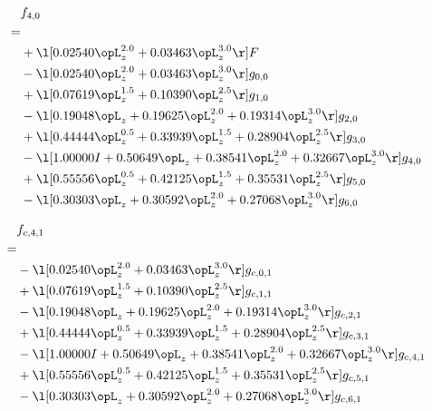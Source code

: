 \begin{alignat}{2} 
\label{eq:f_40_0} 
& f_{4,0} \nonumber \\ 
 = \\ 
& + \l[  0.02540 \opL_z^{2.0} +  0.03463 \opL_z^{3.0}  \r] F \nonumber \\ 
& - \l[  0.02540 \opL_z^{2.0} +  0.03463 \opL_z^{3.0}  \r] g_{0,0} \nonumber \\ 
& + \l[  0.07619 \opL_z^{1.5} +  0.10390 \opL_z^{2.5}  \r] g_{1,0} \nonumber \\ 
& - \l[  0.19048 \opL_z +  0.19625 \opL_z^{2.0} +  0.19314 \opL_z^{3.0}  \r] g_{2,0} \nonumber \\ 
& + \l[  0.44444 \opL_z^{0.5} +  0.33939 \opL_z^{1.5} +  0.28904 \opL_z^{2.5}  \r] g_{3,0} \nonumber \\ 
& - \l[  1.00000 I +  0.50649 \opL_z +  0.38541 \opL_z^{2.0} +  0.32667 \opL_z^{3.0}  \r] g_{4,0} \nonumber \\ 
& + \l[  0.55556 \opL_z^{0.5} +  0.42125 \opL_z^{1.5} +  0.35531 \opL_z^{2.5}  \r] g_{5,0} \nonumber \\ 
& - \l[  0.30303 \opL_z +  0.30592 \opL_z^{2.0} +  0.27068 \opL_z^{3.0}  \r] g_{6,0} \nonumber \\ 
\end{alignat} 


\begin{alignat}{2} 
\label{eq:f_41_0} 
& f_{c,4,1} \nonumber \\ 
 = \\ 
& - \l[  0.02540 \opL_z^{2.0} +  0.03463 \opL_z^{3.0}  \r] g_{c,0,1} \nonumber \\ 
& + \l[  0.07619 \opL_z^{1.5} +  0.10390 \opL_z^{2.5}  \r] g_{c,1,1} \nonumber \\ 
& - \l[  0.19048 \opL_z +  0.19625 \opL_z^{2.0} +  0.19314 \opL_z^{3.0}  \r] g_{c,2,1} \nonumber \\ 
& + \l[  0.44444 \opL_z^{0.5} +  0.33939 \opL_z^{1.5} +  0.28904 \opL_z^{2.5}  \r] g_{c,3,1} \nonumber \\ 
& - \l[  1.00000 I +  0.50649 \opL_z +  0.38541 \opL_z^{2.0} +  0.32667 \opL_z^{3.0}  \r] g_{c,4,1} \nonumber \\ 
& + \l[  0.55556 \opL_z^{0.5} +  0.42125 \opL_z^{1.5} +  0.35531 \opL_z^{2.5}  \r] g_{c,5,1} \nonumber \\ 
& - \l[  0.30303 \opL_z +  0.30592 \opL_z^{2.0} +  0.27068 \opL_z^{3.0}  \r] g_{c,6,1} \nonumber \\ 
\end{alignat} 


